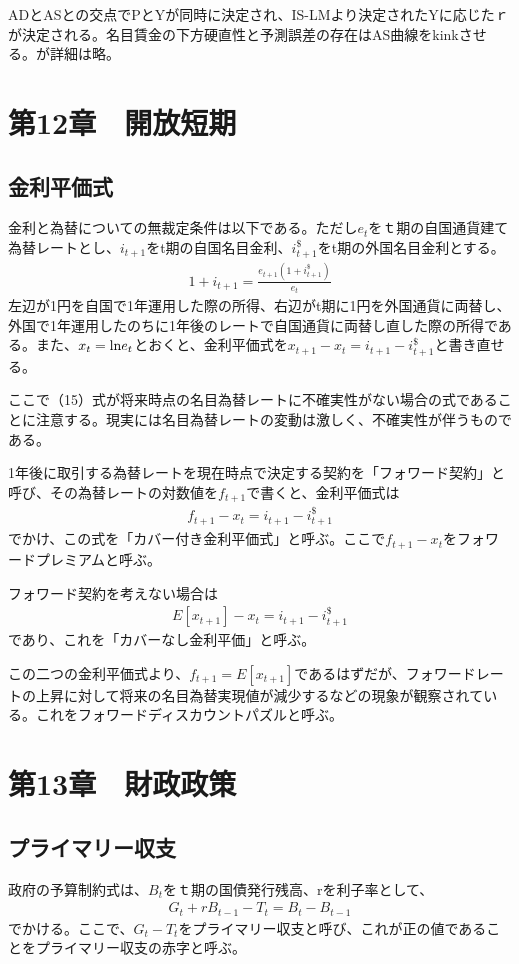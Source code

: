 \documentclass{jsarticle}
\begin{document}
ADとASとの交点でPとYが同時に決定され、IS-LMより決定されたYに応じたｒが決定される。名目賃金の下方硬直性と予測誤差の存在はAS曲線をkinkさせる。が詳細は略。

\section{第12章　開放短期}
\subsection{金利平価式}
金利と為替についての無裁定条件は以下である。ただし$e_t$をｔ期の自国通貨建て為替レートとし、$i_{t+1}$をt期の自国名目金利、$i_{t+1}^{\$}$をt期の外国名目金利とする。
\begin{align}
	1 + i_{t+1} = \frac{e_{t+1}(1 + i_{t+1}^{\$})}{e_t}
\end{align}
左辺が1円を自国で1年運用した際の所得、右辺がt期に1円を外国通貨に両替し、外国で1年運用したのちに1年後のレートで自国通貨に両替し直した際の所得である。また、$x_t = {\rm ln} e_t$とおくと、金利平価式を$x_{t+1} - x_t = i_{t+1} - i_{t+1}^{\$}$と書き直せる。

ここで（15）式が将来時点の名目為替レートに不確実性がない場合の式であることに注意する。現実には名目為替レートの変動は激しく、不確実性が伴うものである。

1年後に取引する為替レートを現在時点で決定する契約を「フォワード契約」と呼び、その為替レートの対数値を$f_{t+1}$で書くと、金利平価式は
\begin{align*}
	f_{t + 1} - x_t = i_{t+1} - i_{t+1}^{\$}
\end{align*}
でかけ、この式を「カバー付き金利平価式」と呼ぶ。ここで$f_{t + 1} - x_t$をフォワードプレミアムと呼ぶ。

フォワード契約を考えない場合は
\begin{align*}
	E[x_{t + 1}] - x_t = i_{t+1} - i_{t+1}^{\$}
\end{align*}
であり、これを「カバーなし金利平価」と呼ぶ。

この二つの金利平価式より、$f_{t+1} = E[x_{t+1}]$であるはずだが、フォワードレートの上昇に対して将来の名目為替実現値が減少するなどの現象が観察されている。これをフォワードディスカウントパズルと呼ぶ。

\section{第13章　財政政策}
\subsection{プライマリー収支}
政府の予算制約式は、$B_t$をｔ期の国債発行残高、rを利子率として、
\begin{align*}
	G_t + rB_{t-1} - T_t = B_t - B_{t-1}
\end{align*}
でかける。ここで、$G_t - T_t$をプライマリー収支と呼び、これが正の値であることをプライマリー収支の赤字と呼ぶ。
\end{document}
